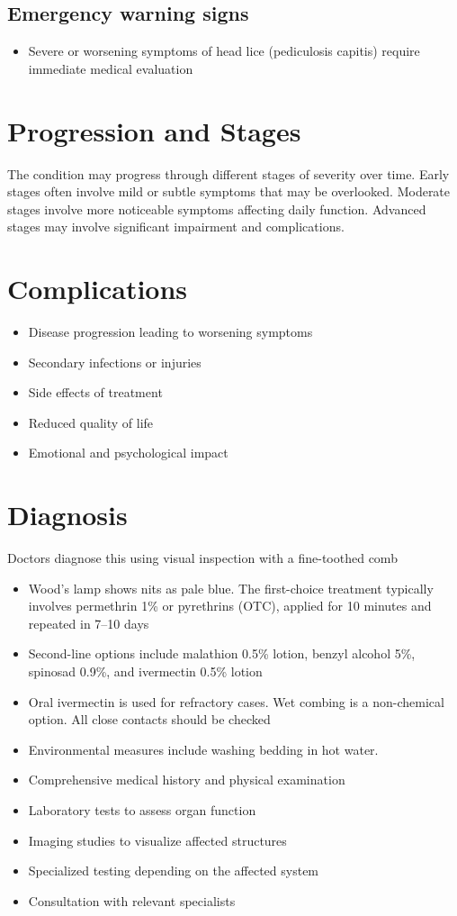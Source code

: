 \subsection{Emergency warning signs}
\begin{itemize}[noitemsep]
  \item Severe or worsening symptoms of head lice (pediculosis capitis) require immediate medical evaluation
\end{itemize}
\section{Progression and Stages}
The condition may progress through different stages of severity over time. Early stages often involve mild or subtle symptoms that may be overlooked. Moderate stages involve more noticeable symptoms affecting daily function. Advanced stages may involve significant impairment and complications.
\section{Complications}
\begin{itemize}[noitemsep]
  \item Disease progression leading to worsening symptoms
  \item Secondary infections or injuries
  \item Side effects of treatment
  \item Reduced quality of life
  \item Emotional and psychological impact
\end{itemize}
\section{Diagnosis}
Doctors diagnose this using visual inspection with a fine-toothed comb

\begin{itemize}[noitemsep]
  \item Wood's lamp shows nits as pale blue. The first-choice treatment typically involves permethrin 1\% or pyrethrins (OTC), applied for 10 minutes and repeated in 7--10 days
  \item Second-line options include malathion 0.5\% lotion, benzyl alcohol 5\%, spinosad 0.9\%, and ivermectin 0.5\% lotion
  \item Oral ivermectin is used for refractory cases. Wet combing is a non-chemical option. All close contacts should be checked
  \item Environmental measures include washing bedding in hot water.
  \item Comprehensive medical history and physical examination
  \item Laboratory tests to assess organ function
  \item Imaging studies to visualize affected structures
  \item Specialized testing depending on the affected system
  \item Consultation with relevant specialists
\end{itemize}
